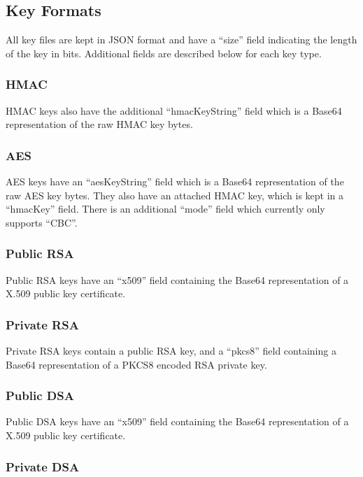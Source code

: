 \documentclass{llncs}
\begin{document}
\subsection{Key Formats}\label{formats}

All key files are kept in JSON format and have a ``size'' field indicating the
length of the key in bits. Additional fields are described below for each key
type.

\subsubsection{HMAC}

HMAC keys also have the additional ``hmacKeyString'' field which is a Base64
representation of the raw HMAC key bytes.

\subsubsection{AES}

AES keys have an ``aesKeyString'' field which is a Base64 representation of the
raw AES key bytes. They also have an attached HMAC key, which is kept in a
``hmacKey'' field. There is an additional ``mode'' field which currently only
supports ``CBC''.

\subsubsection{Public RSA}

Public RSA keys have an ``x509'' field containing the Base64 representation of
a X.509 public key certificate.

\subsubsection{Private RSA}

Private RSA keys contain a public RSA key, and a ``pkcs8'' field containing a
Base64 representation of a PKCS8 encoded RSA private key.

\subsubsection{Public DSA}

Public DSA keys have an ``x509'' field containing the Base64 representation of
a X.509 public key certificate.

\subsubsection{Private DSA}
\end{document}
